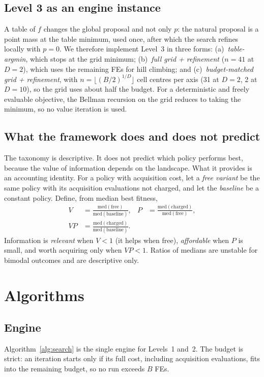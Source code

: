 \documentclass[conference]{IEEEtran}
\begin{document}
\subsection{Level 3 as an engine instance}
A table of $f$ changes the global proposal and not only $p$: the natural proposal is a point mass at the table minimum, used once, after which the search refines locally with $p=0$. We therefore implement Level~3 in three forms: (a)~\emph{table-argmin}, which stops at the grid minimum; (b)~\emph{full grid + refinement} ($n=41$ at $D=2$), which uses the remaining FEs for hill climbing; and (c)~\emph{budget-matched grid + refinement}, with $n=\lfloor (B/2)^{1/D}\rfloor$ cell centres per axis (31 at $D=2$, 2 at $D=10$), so the grid uses about half the budget. For a deterministic and freely evaluable objective, the Bellman recursion on the grid reduces to taking the minimum, so no value iteration is used.

\subsection{What the framework does and does not predict}
The taxonomy is descriptive. It does not predict which policy performs best, because the value of information depends on the landscape. What it provides is an accounting identity. For a policy with acquisition cost, let a \emph{free variant} be the same policy with its acquisition evaluations not charged, and let the \emph{baseline} be a constant policy. Define, from median best fitness,
\begin{align}
V&=\frac{\mathrm{med}(\text{free})}{\mathrm{med}(\text{baseline})}, &
P&=\frac{\mathrm{med}(\text{charged})}{\mathrm{med}(\text{free})},\\
VP&=\frac{\mathrm{med}(\text{charged})}{\mathrm{med}(\text{baseline})}. & &
\end{align}
Information is \emph{relevant} when $V<1$ (it helps when free), \emph{affordable} when $P$ is small, and worth acquiring only when $VP<1$. Ratios of medians are unstable for bimodal outcomes and are descriptive only.

\section{Algorithms}
\subsection{Engine}
Algorithm~\ref{alg:search} is the single engine for Levels~1 and~2. The budget is strict: an iteration starts only if its full cost, including acquisition evaluations, fits into the remaining budget, so no run exceeds $B$ FEs.
\end{document}
